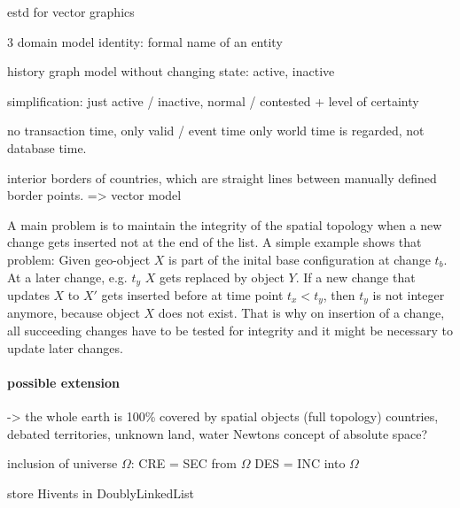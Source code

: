 estd for vector graphics

3 domain model
identity: formal name of an entity

history graph model without changing state: active, inactive

simplification: just active / inactive, normal / contested + level of certainty

no transaction time, only valid / event time
only world time is regarded, not database time.


interior borders of countries, which are straight lines between manually defined border points.
=> vector model

A main problem is to maintain the integrity of the spatial topology when a new change gets inserted not at the end of the list. A simple example shows that problem: Given geo-object $X$ is part of the inital base configuration at change $t_b$. At a later change, e.g. $t_y$ $X$ gets replaced by object $Y$. If a new change that updates $X$ to $X'$ gets inserted before at time point $t_x < t_y$, then $t_y$ is not integer anymore, because object $X$ does not exist. That is why on insertion of a change, all succeeding changes have to be tested for integrity and it might be necessary to update later changes.



\paragraph{possible extension} %
\label{par:possible_extension}


-> the whole earth is 100\% covered by spatial objects (full topology)
  countries, debated territories, unknown land, water
  Newtons concept of absolute space?


inclusion of universe $\Omega$:
CRE = SEC from $\Omega$
DES = INC into $\Omega$





store Hivents in DoublyLinkedList


\label{sub:four_domain_model}

